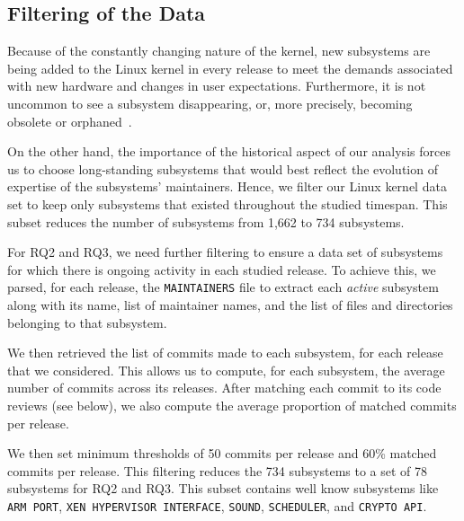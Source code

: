 \subsection{Filtering of the Data}
\label{sec:data-filtering}

Because of the constantly changing nature of the kernel, new subsystems are being added to the Linux kernel in every release to meet the demands associated with new hardware and changes in user expectations. Furthermore, it is not uncommon to see a subsystem disappearing, or, more precisely, becoming obsolete or orphaned~\cite[v4.11, \texttt{MAINTAINERS}, Line~84]{linux}.

On the other hand, the importance of the historical aspect of our analysis forces us to choose long-standing subsystems that would best reflect the evolution of expertise of the subsystems' maintainers. Hence, we filter our Linux kernel data set to keep only subsystems that existed throughout the studied timespan. This subset reduces the number of subsystems from 1,662 to 734 subsystems.

For RQ2 and RQ3, we need further filtering to ensure a data set of subsystems for which there is ongoing activity in each studied release. To achieve this, we %
parsed, for each release, the \texttt{MAINTAINERS} file to extract each \textit{active} subsystem along with its name, list of maintainer names, and the list of files and directories belonging to that subsystem.

We then retrieved the list of commits made to each subsystem, for each release that we considered. This allows us to compute, for each subsystem, the average number of commits across its releases. After matching each commit to its code reviews (see below), we also compute the average proportion of matched commits per release.

We then set minimum thresholds of 50 commits per release and 60\% matched commits per release. This filtering reduces the 734 subsystems to a set of 78 subsystems for RQ2 and RQ3. This subset contains well know subsystems like \texttt{ARM PORT}, \texttt{XEN HYPERVISOR INTERFACE}, \texttt{SOUND}, \texttt{SCHEDULER}, and \texttt{CRYPTO API}.



